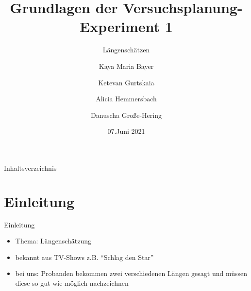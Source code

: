 \documentclass[ ngerman, fontsize= 10pt, headings=big, titlepage=true, xcolor=dvipsnames]{beamer}
\title{Grundlagen der Versuchsplanung-Experiment 1}
\subtitle{Längenschätzen}
\author{Kaya Maria Bayer \and Ketevan Gurtskaia \and Alicia Hemmersbach \and Danuscha Große-Hering}
\date{07.Juni 2021}
\begin{document}
\begin{frame}[plain]
    \maketitle
\end{frame}

\begin{frame}{Inhaltsverzeichnis}
	\tableofcontents
\end{frame}

\section{Einleitung}
\begin{frame}{Einleitung}
\begin{itemize}
\item Thema: Längenschätzung
\item bekannt aus TV-Shows z.B. \enquote{Schlag den Star}
\item bei uns: Probanden bekommen zwei verschiedenen Längen gesagt und müssen diese so gut wie möglich nachzeichnen
\end{itemize}
\end{frame}
\end{document}
